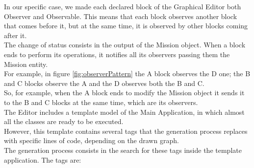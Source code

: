 In our specific case, we made each declared block of the Graphical Editor both Observer and Observable. 
This means that each block observes another block that comes before it, but at the same time, it is observed by other blocks coming after it.
\\
The change of status consists in the output of the Mission object.
When a block ends to perform its operations, it notifies all its observers passing them the Mission entity.
\\
For example, in figure \ref{fig:observerPattern} the A block observes the D one; the B and C blocks observe the A and the D observes both the B and C.
\\
So, for example, when the A block ends to modify the Mission object it sends it to the B and C blocks at the same time, which are its observers.
\\

The Editor includes a template model of the Main Application, in which almost all the classes are ready to be executed.
\\
However, this template contains several tags that the generation process replaces with specific lines of code, depending on the drawn graph.
\\
The generation process consists in the search for these tags inside the template application. 
The tags are:
\\

